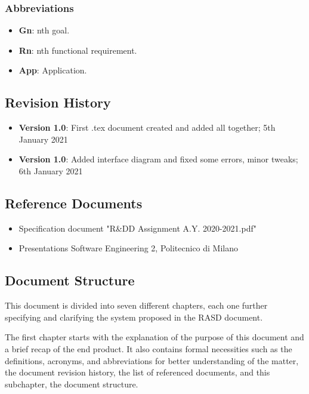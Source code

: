\subsubsection{Abbreviations}
\begin{itemize}
	\item \textbf{Gn}: nth goal.
	\item \textbf{Rn}: nth functional requirement.
	\item \textbf{App}: Application.
\end{itemize}

\newpage
\subsection{Revision History}
\begin{itemize}
	\item \textbf{Version 1.0}: First .tex document created and added all together; 5th January 2021
		\item \textbf{Version 1.0}: Added interface diagram and fixed some errors, minor tweaks; 6th January 2021
\end{itemize}

\newpage
\subsection{Reference Documents}
\begin{itemize}
	\item Specification document "R\&DD Assignment A.Y. 2020-2021.pdf"
	\item Presentations Software Engineering 2, Politecnico di Milano
\end{itemize}

\newpage
\subsection{Document Structure}
\hspace{\parindent} This document is divided into seven different chapters, each one further specifying and clarifying the system proposed in the RASD document. \newline

The first chapter starts with the explanation of the purpose of this document and a brief recap of the end product. It also contains formal necessities such as the definitions, acronyms, and abbreviations for better understanding of the matter, the document revision history, the list of referenced documents, and this subchapter, the document structure. \newline 

